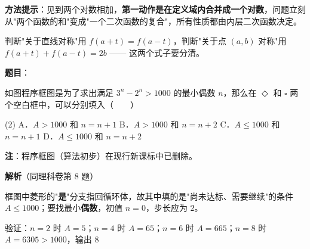 \begin{answer}
\begin{gktip}
\textbf{方法提示}：见到两个对数相加，\textbf{第一动作是在定义域内合并成一个对数}，问题立刻从"两个函数的和"变成"一个二次函数的复合"，所有性质都由内层二次函数决定。

判断"关于直线对称"用 $f(a+t)=f(a-t)$，判断"关于点 $(a,b)$ 对称"用 $f(a+t)+f(a-t)=2b$ —— 这两个式子要分清。
\end{gktip}


\par\medskip

\end{answer}
\begin{answer}

\textbf{题目}：

如图程序框图是为了求出满足 $3^{n}-2^{n}>1000$ 的最小偶数 $n$，那么在 $\Diamond$ 和 $\square$ 两个空白框中，可以分别填入\mbox{（　　）}
\nopagebreak[4]
\begin{center}\end{center}
\nopagebreak[4]
\begin{gkopts}(2)
\task A．$A>1000$ 和 $n=n+1$
\task B．$A>1000$ 和 $n=n+2$
\task C．$A\le1000$ 和 $n=n+1$
\task D．$A\le1000$ 和 $n=n+2$
\end{gkopts}

\begin{gktip}
\textbf{注}：程序框图（算法初步）在现行新课标中已删除。
\end{gktip}

\Needspace{0.25\textheight}

\textbf{解析}（同理科卷第 8 题）

框图中菱形的"\textbf{是}"分支指回循环体，故其中填的是"尚未达标、需要继续"的条件 $A\le1000$；要找最小\textbf{偶数}，初值 $n=0$，步长应为 $2$。

验证：$n=2$ 时 $A=5$；$n=4$ 时 $A=65$；$n=6$ 时 $A=665$；$n=8$ 时 $A=6305>1000$，输出 $8$ 


\par\medskip

\end{answer}
